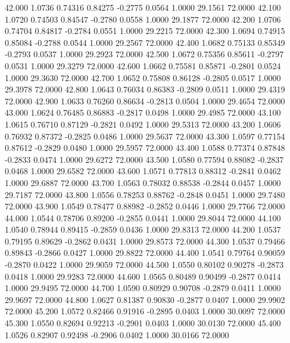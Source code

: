   42.000   1.0736   0.74316   0.84275  -0.2775   0.0564   1.0000  29.1561  72.0000
  42.100   1.0720   0.74503   0.84547  -0.2780   0.0558   1.0000  29.1877  72.0000
  42.200   1.0706   0.74704   0.84817  -0.2784   0.0551   1.0000  29.2215  72.0000
  42.300   1.0694   0.74915   0.85084  -0.2788   0.0544   1.0000  29.2567  72.0000
  42.400   1.0682   0.75133   0.85349  -0.2793   0.0537   1.0000  29.2923  72.0000
  42.500   1.0672   0.75356   0.85611  -0.2797   0.0531   1.0000  29.3279  72.0000
  42.600   1.0662   0.75581   0.85871  -0.2801   0.0524   1.0000  29.3630  72.0000
  42.700   1.0652   0.75808   0.86128  -0.2805   0.0517   1.0000  29.3978  72.0000
  42.800   1.0643   0.76034   0.86383  -0.2809   0.0511   1.0000  29.4319  72.0000
  42.900   1.0633   0.76260   0.86634  -0.2813   0.0504   1.0000  29.4654  72.0000
  43.000   1.0624   0.76485   0.86883  -0.2817   0.0498   1.0000  29.4985  72.0000
  43.100   1.0615   0.76710   0.87129  -0.2821   0.0492   1.0000  29.5313  72.0000
  43.200   1.0606   0.76932   0.87372  -0.2825   0.0486   1.0000  29.5637  72.0000
  43.300   1.0597   0.77154   0.87612  -0.2829   0.0480   1.0000  29.5957  72.0000
  43.400   1.0588   0.77374   0.87848  -0.2833   0.0474   1.0000  29.6272  72.0000
  43.500   1.0580   0.77594   0.88082  -0.2837   0.0468   1.0000  29.6582  72.0000
  43.600   1.0571   0.77813   0.88312  -0.2841   0.0462   1.0000  29.6887  72.0000
  43.700   1.0563   0.78032   0.88538  -0.2844   0.0457   1.0000  29.7187  72.0000
  43.800   1.0556   0.78253   0.88762  -0.2848   0.0451   1.0000  29.7480  72.0000
  43.900   1.0549   0.78477   0.88982  -0.2852   0.0446   1.0000  29.7766  72.0000
  44.000   1.0544   0.78706   0.89200  -0.2855   0.0441   1.0000  29.8044  72.0000
  44.100   1.0540   0.78944   0.89415  -0.2859   0.0436   1.0000  29.8313  72.0000
  44.200   1.0537   0.79195   0.89629  -0.2862   0.0431   1.0000  29.8573  72.0000
  44.300   1.0537   0.79466   0.89843  -0.2866   0.0427   1.0000  29.8822  72.0000
  44.400   1.0541   0.79764   0.90059  -0.2870   0.0422   1.0000  29.9059  72.0000
  44.500   1.0550   0.80102   0.90278  -0.2873   0.0418   1.0000  29.9283  72.0000
  44.600   1.0565   0.80489   0.90499  -0.2877   0.0414   1.0000  29.9495  72.0000
  44.700   1.0590   0.80929   0.90708  -0.2879   0.0411   1.0000  29.9697  72.0000
  44.800   1.0627   0.81387   0.90830  -0.2877   0.0407   1.0000  29.9902  72.0000
  45.200   1.0572   0.82466   0.91916  -0.2895   0.0403   1.0000  30.0097  72.0000
  45.300   1.0550   0.82694   0.92213  -0.2901   0.0403   1.0000  30.0130  72.0000
  45.400   1.0526   0.82907   0.92498  -0.2906   0.0402   1.0000  30.0166  72.0000
